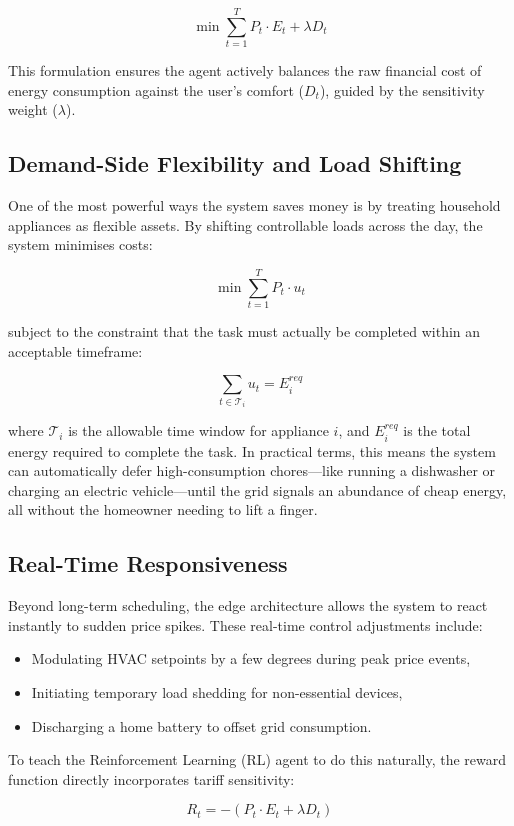 \documentclass[11pt,a4paper]{article}
\begin{document}
$$\min \sum_{t=1}^{T} P_t \cdot E_t + \lambda D_t$$

This formulation ensures the agent actively balances the raw financial cost of energy consumption against the user's comfort ($D_t$), guided by the sensitivity weight ($\lambda$).

\subsection{Demand-Side Flexibility and Load Shifting}

One of the most powerful ways the system saves money is by treating household appliances as flexible assets. By shifting controllable loads across the day, the system minimises costs:

$$\min \sum_{t=1}^{T} P_t \cdot u_t$$

subject to the constraint that the task must actually be completed within an acceptable timeframe:

$$\sum_{t \in \mathcal{T}_i} u_t=E_i^{req}$$

where $\mathcal{T}_i$ is the allowable time window for appliance $i$, and $E_i^{req}$ is the total energy required to complete the task. In practical terms, this means the system can automatically defer high-consumption chores---like running a dishwasher or charging an electric vehicle---until the grid signals an abundance of cheap energy, all without the homeowner needing to lift a finger.

\subsection{Real-Time Responsiveness}

Beyond long-term scheduling, the edge architecture allows the system to react instantly to sudden price spikes. These real-time control adjustments include:
\begin{itemize}
    \item Modulating HVAC setpoints by a few degrees during peak price events,
    \item Initiating temporary load shedding for non-essential devices,
    \item Discharging a home battery to offset grid consumption.
\end{itemize}

To teach the Reinforcement Learning (RL) agent to do this naturally, the reward function directly incorporates tariff sensitivity:

$$R_t=-\left( P_t \cdot E_t + \lambda D_t \right)$$
\end{document}
